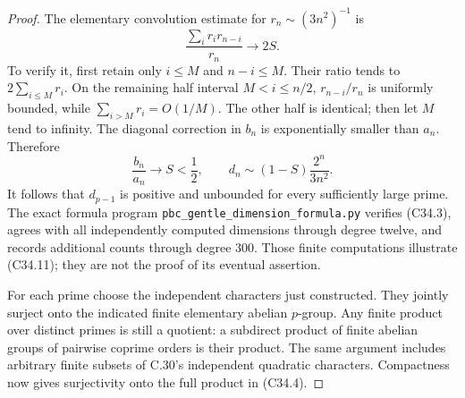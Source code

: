 \begin{proof}
The elementary convolution estimate for
$r_n\sim(3n^2)^{-1}$ is
\[
 \frac{\sum_i r_i r_{n-i}}{r_n}\longrightarrow2S.                \tag{C34.10}
\]
To verify it, first retain only $i\leq M$ and $n-i\leq M$.
Their ratio tends to $2\sum_{i\leq M}r_i$.
On the remaining half interval $M<i\leq n/2$,
$r_{n-i}/r_n$ is uniformly bounded, while
$\sum_{i>M}r_i=O(1/M)$.  The other half is identical;
then let $M$ tend to infinity.
The diagonal correction in $b_n$ is exponentially
smaller than $a_n$.  Therefore
\[
 \frac{b_n}{a_n}\longrightarrow S<\frac12,\qquad
 d_n\sim(1-S)\frac{2^n}{3n^2}.                                  \tag{C34.11}
\]
It follows that $d_{p-1}$ is positive and unbounded
for every sufficiently large prime.
The exact formula program
\texttt{pbc\_gentle\_dimension\_formula.py} verifies
(C34.3), agrees with all independently computed
dimensions through degree twelve, and records additional
counts through degree $300$.  Those finite computations
illustrate (C34.11); they are not the proof of its
eventual assertion.

For each prime choose the independent characters just
constructed.  They jointly surject onto the indicated
finite elementary abelian $p$-group.  Any finite product
over distinct primes is still a quotient: a subdirect
product of finite abelian groups of pairwise coprime
orders is their product.  The same argument includes
arbitrary finite subsets of C.30's independent
quadratic characters.  Compactness now gives
surjectivity onto the full product in (C34.4).
\end{proof}


